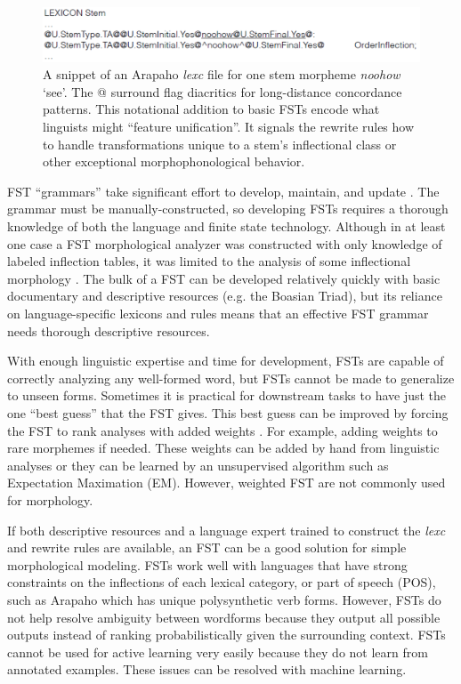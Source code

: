 \documentclass[12pt]{article}
\begin{document}
\bigskip
\begin{figure}[t]
\begin{center}
\includegraphics[width=0.95\columnwidth]{FSTlexicon.PNG}
\caption{A snippet of an Arapaho \textit{lexc} file for one stem morpheme \textit{noohow} `see'. The @ surround flag diacritics for long-distance concordance patterns. This notational addition to basic FSTs encode what linguists might ``feature unification''. It signals the rewrite rules how to handle transformations unique to a stem's inflectional class or other exceptional morphophonological behavior.}
\label{fig:lexc}
\end{center}
\end{figure}

FST “grammars” take significant effort to develop, maintain, and update \cite{durrett_supervised_2013,moeller_neural_2018}. The grammar must be manually-constructed, so developing FSTs requires a thorough knowledge of both the language and finite state technology. Although in at least one case a FST morphological analyzer was constructed with only knowledge of labeled inflection tables, it was limited to the analysis of some inflectional morphology \cite{forsberg_learning_2016}. The bulk of a FST can be developed relatively quickly with basic documentary and descriptive resources (e.g. the Boasian Triad), but its reliance on language-specific lexicons and rules means that an effective FST grammar needs thorough descriptive resources.  

With enough linguistic expertise and time for development, FSTs are capable of correctly analyzing any well-formed word, but FSTs cannot be made to generalize to unseen forms. Sometimes it is practical for downstream tasks to have just the one ``best guess'' that the FST gives. This best guess can be improved by forcing the FST to rank analyses with added weights \cite{roark_computational_2007}. For example, adding weights to rare morphemes if needed. These weights can be added by hand from linguistic analyses or they can be learned by an unsupervised algorithm such as Expectation Maximation (EM). However, weighted FST are not commonly used for morphology.

If both descriptive resources and a language expert trained to construct the \textit{lexc} and rewrite rules are available, an FST can be a good solution for simple morphological modeling. FSTs work well with languages that have strong constraints on the inflections of each lexical category, or part of speech (POS), such as Arapaho which has unique polysynthetic verb forms. However, FSTs do not help resolve ambiguity between wordforms because they output all possible outputs instead of ranking probabilistically given the surrounding context. FSTs cannot be used for active learning very easily because they do not learn from annotated examples. These issues can be resolved with machine learning. 
\end{document}
